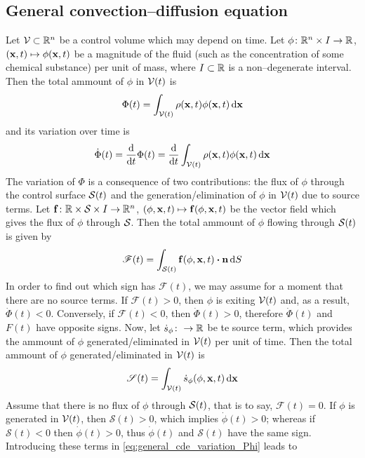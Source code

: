 
\subsection{General convection--diffusion equation}

Let $\mathcal{V}_{} \subset \mathbb{R}^n$ be a control volume which may depend on time. Let $\phi \colon \mathbb{R}^n \times I \to \mathbb{R}$, $(\vb{x}, t) \mapsto \phi(\vb{x}, t)$ be a magnitude of the fluid (such as the concentration of some chemical substance) per unit of mass, where $I \subset \mathbb{R}$ is a non--degenerate interval. Then the total ammount of $\phi$ in ${\mathcal{V}(t)}$ is
\begin{equation}
	\Phi(t) = 
	\int_{{\mathcal{V}(t)}} \rho(\vb{x}, t) \phi(\vb{x}, t) \dd{\vb{x}}
\end{equation}
and its variation over time is
\begin{equation} \label{eq:general_cde_variation_Phi}
	\dot{\Phi}(t) =
	\frac{\dd}{\dd t} \Phi(t) = 
	\frac{\dd}{\dd{t}} \int_{{\mathcal{V}(t)}} \rho(\vb{x}, t) \phi(\vb{x}, t) \dd{\vb{x}}
\end{equation}
The variation of $\Phi$ is a consequence of two contributions: the flux of $\phi$ through the control surface ${\mathcal{S}(t)}$ and the generation/elimination of $\phi$ in ${\mathcal{V}(t)}$ due to source terms. Let $\vb{f} \colon \mathbb{R} \times \mathcal{S}_{} \times I \rightarrow \mathbb{R}^n$, $(\phi, \vb{x}, t) \mapsto \vb{f}(\phi, \vb{x}, t)$ be the vector field which gives the flux of $\phi$ through $\mathcal{S}_{}$. Then the total ammount of $\phi$ flowing through ${\mathcal{S}(t)}$ is given by
\begin{equation}
	\mathscr{F}(t) = \int_{\cst} \vb{f}(\phi, \vb{x}, t) \vdot \vb{n} \dd{S}
\end{equation}
In order to find out which sign has $\mathscr{F}(t)$, we may assume for a moment that there are no source terms. If $\mathscr{F}(t) > 0$, then $\phi$ is exiting ${\mathcal{V}(t)}$ and, as a result, $\dot{\Phi}(t) < 0$. Conversely, if $\mathscr{F}(t) < 0$, then $\dot{\Phi}(t) > 0$, therefore $\dot{\Phi}(t)$ and $F(t)$ have opposite signs. Now, let $\dot{s}_\phi \colon \rightarrow \mathbb{R}$ be te source term, which provides the ammount of $\phi$ generated/eliminated in ${\mathcal{V}(t)}$ per unit of time. Then the total ammount of $\phi$ generated/eliminated in ${\mathcal{V}(t)}$ is
\begin{equation}
	\mathscr{S}(t) = \int_{{\mathcal{V}(t)}} \dot{s}_\phi (\phi, \vb{x}, t) \dd{\vb{x}}
\end{equation}
Assume that there is no flux of $\phi$ through ${\mathcal{S}(t)}$, that is to say, $\mathscr{F}(t) = 0$. If $\phi$ is generated in ${\mathcal{V}(t)}$, then $\mathscr{S}(t) > 0$, which implies $\dot{\phi}(t) > 0$; whereas if $\mathscr{S}(t) < 0$ then $\dot{\phi}(t) > 0$, thus $\dot{\phi}(t)$ and $\mathscr{S}(t)$ have the same sign. Introducing these terms in \eqref{eq:general_cde_variation_Phi} leads to
